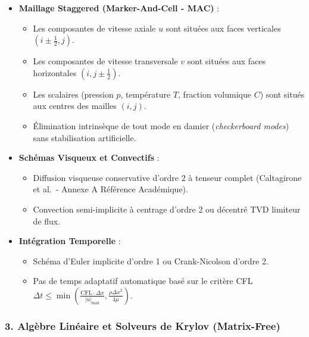 \documentclass[
  french,
]{article}
\providecommand{\tightlist}{%
  \setlength{\itemsep}{0pt}\setlength{\parskip}{0pt}}
\begin{document}
\begin{itemize}
\tightlist
\item
  \textbf{Maillage Staggered (Marker-And-Cell - MAC)} :

  \begin{itemize}
  \tightlist
  \item
    Les composantes de vitesse axiale \(u\) sont situées aux faces
    verticales \((i \pm \frac{1}{2}, j)\).
  \item
    Les composantes de vitesse transversale \(v\) sont situées aux faces
    horizontales \((i, j \pm \frac{1}{2})\).
  \item
    Les scalaires (pression \(p\), température \(T\), fraction volumique
    \(C\)) sont situés aux centres des mailles \((i, j)\).
  \item
    Élimination intrinsèque de tout mode en damier (\emph{checkerboard
    modes}) sans stabilisation artificielle.
  \end{itemize}
\item
  \textbf{Schémas Visqueux et Convectifs} :

  \begin{itemize}
  \tightlist
  \item
    Diffusion visqueuse conservative d'ordre 2 à tenseur complet
    (Caltagirone et al.~- Annexe A Référence Académique).
  \item
    Convection semi-implicite à centrage d'ordre 2 ou décentré TVD
    limiteur de flux.
  \end{itemize}
\item
  \textbf{Intégration Temporelle} :

  \begin{itemize}
  \tightlist
  \item
    Schéma d'Euler implicite d'ordre 1 ou Crank-Nicolson d'ordre 2.
  \item
    Pas de temps adaptatif automatique basé sur le critère CFL
    \(\Delta t \le \min\left( \frac{\text{CFL} \cdot \Delta x}{|u|_{\max}}, \frac{\rho \Delta x^2}{4\mu} \right)\).
  \end{itemize}
\end{itemize}

\subsubsection{3. Algèbre Linéaire et Solveurs de Krylov
(Matrix-Free)}\label{alguxe8bre-linuxe9aire-et-solveurs-de-krylov-matrix-free}
\end{document}
